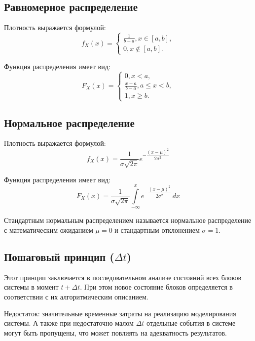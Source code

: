 \subsection{Равномерное распределение}
Плотность выражается формулой:
\begin{equation}
	f_X(x) = 
	\left\{\begin{array}{l}
		\frac{1}{b - a}, x \in [a, b], \\
		0, x \notin [a, b].
	\end{array}\right.
\end{equation}

Функция распределения имеет вид:
\begin{equation}
	F_X(x) = 
	\left\{\begin{array}{l}
		0, x < a, \\
		\frac{x - a}{b - a}, a \leq x < b, \\
		1, x \geq b.
	\end{array}\right.
\end{equation}

\subsection{Нормальное распределение}
Плотность выражается формулой:
\begin{equation}
	f_X(x) = \frac{1}{\sigma \sqrt{2 \pi}} e^{-\dfrac{(x - \mu)^2}{2 \sigma^2}}
\end{equation}

Функция распределения имеет вид:
\begin{equation}
	F_X(x) = \frac{1}{\sigma \sqrt{2 \pi}} \int\limits_{-\infty}^x e^{-\dfrac{(x - \mu)^2}{2 \sigma^2}} \,dx
\end{equation}

Стандартным нормальным распределением называется нормальное распределение с математическим ожиданием $\mu = 0$ и стандартным отклонением $\sigma = 1$.

\subsection{Пошаговый принцип ($\Delta t$)}
Этот принцип заключается в последовательном анализе состояний всех блоков системы в момент $t + \Delta t$. При этом новое состояние блоков определяется в соответствии с их алгоритмическим описанием. 

Недостаток: значительные временные затраты на реализацию моделирования системы. А также при недостаточно малом $\Delta t$ отдельные события в системе могут быть пропущены, что может повлиять на адекватность результатов.

